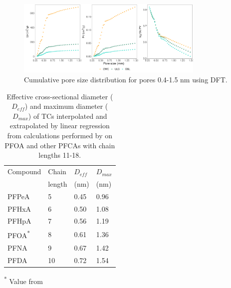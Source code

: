 
\begin{figure}[htb]
    \centering
    \includegraphics[width=0.8\textwidth]{R/figs/PZD_SAPV_C_small_plot.pdf}
    \caption{Cumulative pore size distribution for pores 0.4-1.5 nm using DFT.}
    \label{fig:PZD_small}
\end{figure}

\begin{table}
\caption{Effective cross-sectional diameter ($D_{eff}$) and maximum diameter ($D_{max}$) of TCs interpolated and extrapolated by linear regression from calculations performed by \cite{inoue2012size} on PFOA and other PFCAs with chain lengths 11-18.}
\centering
\begin{threeparttable}
\label{tab:molecsize}
\begin{tabular}{llll}
\toprule
Compound & Chain & $D_{eff}$ & $D_{max}$ \\ 
& length & (nm) & (nm) \\ \midrule
PFPeA & 5  & 0.45  & 0.96  \\
PFHxA & 6  & 0.50  & 1.08  \\
PFHpA & 7  & 0.56  & 1.19  \\
PFOA\textsuperscript{*} & 8 & 0.61 & 1.36 \\
PFNA & 9 & 0.67 & 1.42  \\
PFDA & 10 & 0.72 & 1.54  \\ \bottomrule                                    
\end{tabular}
\begin{tablenotes}
\item \textsuperscript{*} Value from \cite{inoue2012size}
\end{tablenotes}
\end{threeparttable}
\end{table}

